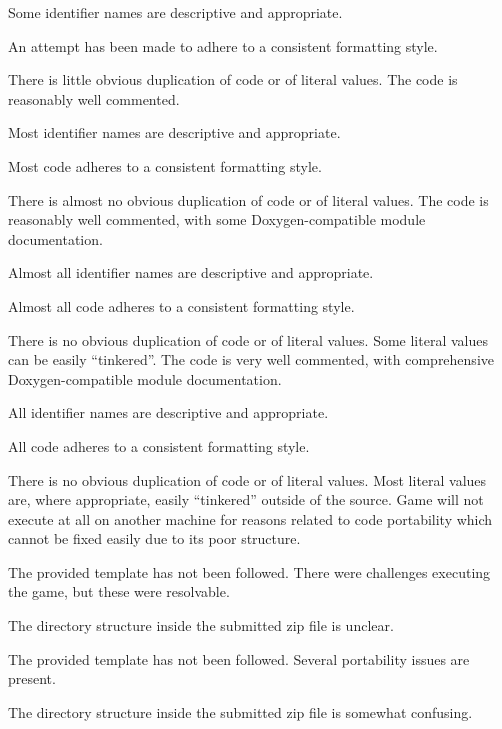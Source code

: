 \documentclass{../fal_assignment}
\begin{document}
\begin{markingrubric}
            \par Some identifier names are descriptive and appropriate.
            \par An attempt has been made to adhere to a consistent formatting style.
             \par There is little obvious duplication of code or of literal values.           
        \grade The code is reasonably well commented.
            \par Most identifier names are descriptive and appropriate.
            \par Most code adheres to a consistent formatting style.
             \par There is almost no obvious duplication of code or of literal values.   
        \grade The code is reasonably well commented, with some Doxygen-compatible module documentation.
            \par Almost all identifier names are descriptive and appropriate.
            \par Almost all code adheres to a consistent formatting style.
             \par There is no obvious duplication of code or of literal values. Some literal values can be easily ``tinkered''. 
        \grade The code is very well commented, with comprehensive Doxygen-compatible module documentation.
            \par All identifier names are descriptive and appropriate.
            \par All code adheres to a consistent formatting style.
             \par There is no obvious duplication of code or of literal values. Most literal values are, where appropriate, easily ``tinkered'' outside of the source.  
%
        \grade\fail Game will not execute at all on another machine for reasons related to code portability which cannot be fixed easily due to its poor structure.
            \par The provided template has not been followed.
        \grade There were challenges executing the game, but these were resolvable.
            \par The directory structure inside the submitted zip file is unclear.
            \par The provided template has not been followed.
        \grade Several portability issues are present.
            \par The directory structure inside the submitted zip file is somewhat confusing.

\end{markingrubric}
\end{document}
